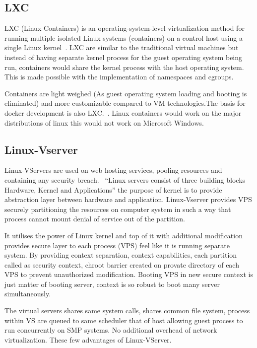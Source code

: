 {\subsection{LXC \cv}
     
LXC (Linux Containers) is an operating-system-level virtualization
method for running multiple isolated Linux systems (containers) on a
control host using a single Linux kernel~\cite{www-wiki-lxc}. LXC are
similar to the traditional virtual machines but instead of having
separate kernel process for the guest operating system being run,
containers would share the kernel process with the host operating
system. This is made possible with the implementation of namespaces
and cgroups.~\cite{www-jpablo}

Containers are light weighed (As guest operating system loading and
booting is eliminated) and more customizable compared to VM
technologies.The basis for docker development is also
LXC.~\cite{www-infoworld}. Linux containers would work on the major
distributions of linux this would not work on Microsoft Windows.
	
\subsection{Linux-Vserver \cv}

Linux-VServers are used on web hosting services, pooling resources and
containing any security breach.~\cite{www-linux-vserver-org} ``Linux
servers consist of three building blocks Hardware, Kernel and
Applications'' the purpose of kernel is to provide abstraction layer
between hardware and application. Linux-Vserver provides VPS securely
partitioning the resources on computer system in such a way that
process cannot mount denial of service out of the partition.
     
     It utilises the power of Linux kernel and top of it with
     additional modification provides secure layer to each process
     (VPS) feel like it is running separate system.  By providing
     context separation, context capabilities, each partition called
     as security context, chroot barrier created on provate directory
     of each VPS to prevent unauthorized modification. Booting VPS in
     new secure context is just matter of booting server, context is
     so robust to boot many server simultaneously.
     
     The virtual servers shares same system calls, shares common file
     system, process within VS are queued to same scheduler that of
     host allowing guest process to run concurrently on SMP
     systems. No additional overhead of network virtualization.  These
     few advantages of Linux-VServer.

}
